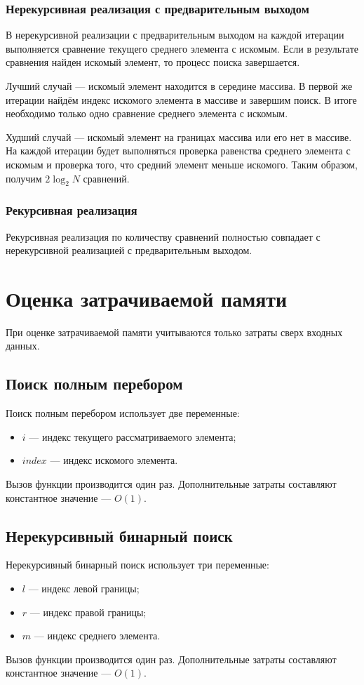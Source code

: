 \subsubsection{Нерекурсивная реализация с предварительным выходом}
В нерекурсивной реализации с предварительным выходом на каждой итерации выполняется сравнение текущего среднего элемента с искомым. Если в результате сравнения найден искомый элемент, то процесс поиска завершается.

Лучший случай --- искомый элемент находится в середине массива. В первой же итерации найдём индекс искомого элемента в массиве и завершим поиск. В итоге необходимо только одно сравнение среднего элемента с искомым.

Худший случай --- искомый элемент на границах массива или его нет в массиве. На каждой итерации будет выполняться проверка равенства среднего элемента с искомым и проверка того, что средний элемент меньше искомого. Таким образом, получим $2\log_2N$ сравнений.

\subsubsection{Рекурсивная реализация}
Рекурсивная реализация по количеству сравнений полностью совпадает с нерекурсивной реализацией с предварительным выходом.

\section{Оценка затрачиваемой памяти}
При оценке затрачиваемой памяти учитываются только затраты сверх входных данных.

\subsection{Поиск полным перебором}
Поиск полным перебором использует две переменные:
\begin{itemize}
	\item $i$ --- индекс текущего рассматриваемого элемента;
	\item $index$ --- индекс искомого элемента.
\end{itemize}
Вызов функции производится один раз. 
Дополнительные затраты составляют константное значение --- $O(1)$.

\subsection{Нерекурсивный бинарный поиск}
Нерекурсивный бинарный поиск использует три переменные:
\begin{itemize}
	\item $l$ --- индекс левой границы;
	\item $r$ --- индекс правой границы;
	\item $m$ --- индекс среднего элемента.
\end{itemize}
Вызов функции производится один раз.
Дополнительные затраты составляют константное значение --- $O(1)$.

